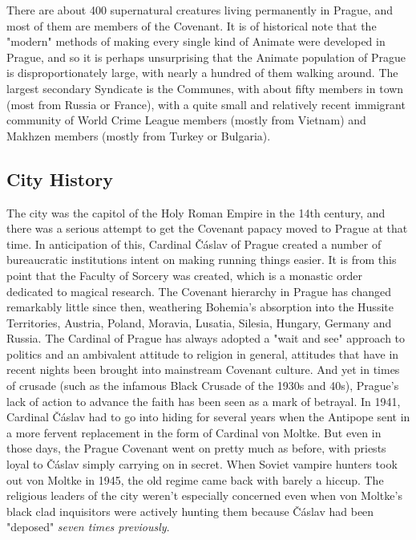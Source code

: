 There are about 400 supernatural creatures living permanently in Prague, and most of them are members of the Covenant. It is of historical note that the "modern" methods of making every single kind of Animate were developed in Prague, and so it is perhaps unsurprising that the Animate population of Prague is disproportionately large, with nearly a hundred of them walking around. The largest secondary Syndicate is the Communes, with about fifty members in town (most from Russia or France), with a quite small and relatively recent immigrant community of World Crime League members (mostly from Vietnam) and Makhzen members (mostly from Turkey or Bulgaria).

\subsection{City History}

\hspace{\parindent} The city was the capitol of the Holy Roman Empire in the 14th century, and there was a serious attempt to get the Covenant papacy moved to Prague at that time. In anticipation of this, Cardinal \v{C}\'{a}slav of Prague created a number of bureaucratic institutions intent on making running things easier. It is from this point that the Faculty of Sorcery was created, which is a monastic order dedicated to magical research. The Covenant hierarchy in Prague has changed remarkably little since then, weathering Bohemia's absorption into the Hussite Territories, Austria, Poland, Moravia, Lusatia, Silesia, Hungary, Germany and Russia. The Cardinal of Prague has always adopted a "wait and see" approach to politics and an ambivalent attitude to religion in general, attitudes that have in recent nights been brought into mainstream Covenant culture. And yet in times of crusade (such as the infamous Black Crusade of the 1930s and 40s), Prague's lack of action to advance the faith has been seen as a mark of betrayal. In 1941, Cardinal \v{C}\'{a}slav had to go into hiding for several years when the Antipope sent in a more fervent replacement in the form of Cardinal von Moltke. But even in those days, the Prague Covenant went on pretty much as before, with priests loyal to \v{C}\'{a}slav simply carrying on in secret. When Soviet vampire hunters took out von Moltke in 1945, the old regime came back with barely a hiccup. The religious leaders of the city weren't especially concerned even when von Moltke's black clad inquisitors were actively hunting them because \v{C}\'{a}slav had been "deposed" \textit{seven times previously}.

